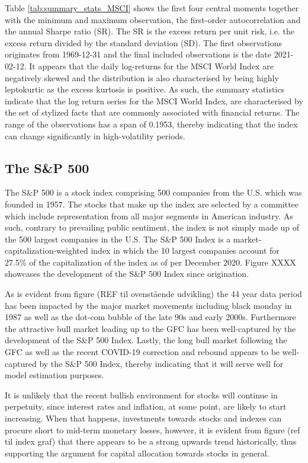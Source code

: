 Table \ref{tab:summary_stats_MSCI} shows the first four central moments together with the minimum and maximum observation, the first-order autocorrelation and the annual Sharpe ratio (SR). The SR is the excess return per unit risk, i.e. the excess return divided by the standard deviation (SD). The first observations originates from 1969-12-31 and the final included observations is the date 2021-02-12. It appears that the daily log-returns for the MSCI World Index are negatively skewed and the distribution is also characterised by being highly leptokurtic as the excess kurtosis is positive. As such, the summary statistics indicate that the log return series for the MSCI World Index, are characterised by the set of stylized facts that are commonly associated with financial returns. The range of the observations has a span of 0.1953, thereby indicating that the index can change significantly in high-volatility periods.    
 
\subsection{The S\&P 500}
The S\&P 500 is a stock index comprising 500 companies from the U.S. which was founded in 1957. The stocks that make up the index are selected by a committee which include representation from all major segments in American industry. As such, contrary to prevailing public sentiment, the index is not simply made up of the 500 largest companies in the U.S. The S\&P 500 Index is a market-capitalization-weighted index in which the 10 largest companies account for 27.5\% of the capitalization of the index as of per December 2020. Figure XXXX showcases the development of the S\&P 500 Index since origination. 
 

As is evident from figure (REF til ovenstående udvikling) the 44 year data period has been impacted by the major market movements including black monday in 1987 as well as the dot-com bubble of the late 90s and early 2000s. Furthermore the attractive bull market leading up to the GFC has been well-captured by the development of the S\&P 500 Index. Lastly, the long bull market following the GFC as well as the recent COVID-19 correction and rebound appears to be well-captured by the S\&P 500 Index, thereby indicating that it will serve well for model estimation purposes.  

It is unlikely that the recent bullish environment for stocks will continue in perpetuity, since interest rates and inflation, at some point, are likely to start increasing. When that happens, investments towards stocks and indexes can procure short to mid-term monetary losses, however, it is evident from figure (ref til index graf) that there appears to be a strong upwards trend historically, thus supporting the argument for capital allocation towards stocks in general.


